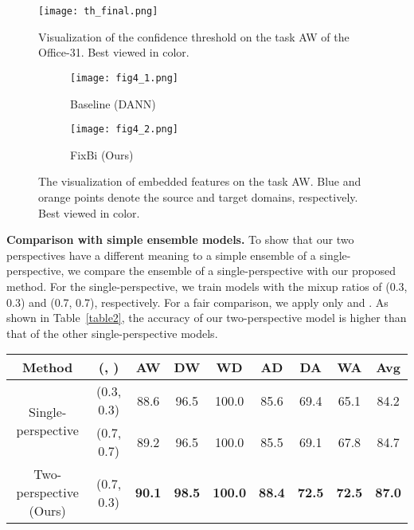 \documentclass[final]{cvpr}
\begin{document}
\begin{figure}[t]
\hspace{-3.0mm}
\centering
\texttt{[image: th\_final.png]}
\caption{Visualization of the confidence threshold  on the task AW of the Office-31. Best viewed in color.}
\label{fig:04}
\end{figure}

\begin{figure}[t]
    \hspace{1.5mm}
    \centering
    \begin{subfigure}[b]{0.45\columnwidth}
        \texttt{[image: fig4\_1.png]}
        \caption{Baseline (DANN)}
        \label{fig:05_1}
    \end{subfigure}
    \begin{subfigure}[b]{0.45\columnwidth}
        \texttt{[image: fig4\_2.png]}
        \caption{FixBi (Ours)}
        \label{fig:05_2}
    \end{subfigure}
    \vspace{1.5mm}
    \caption{The visualization of embedded features on the task AW. Blue and orange points denote the source and target domains, respectively. Best viewed in color.}
    \label{fig:05}
\end{figure}

\textbf{Comparison with simple ensemble models.} To show that our two perspectives have a different meaning to a simple ensemble of a single-perspective, we compare the ensemble of a single-perspective with our proposed method. For the single-perspective, we train models with the mixup ratios of (0.3, 0.3) and (0.7, 0.7), respectively. For a fair comparison, we apply only  and . As shown in Table~\ref{table2}, the accuracy of our two-perspective model is higher than that of the other single-perspective models.

\begin{table*}[t]
\centering
\caption{Comparison of ensemble networks on Office-31.}
\label{table2}
\begin{tabular}{c|c|c|c|c|c|c|c|c}
\hline
      Method   & (, ) & AW & DW & WD & AD & DA & WA & Avg           \\ \hline \hline
\multirow{2}{*}{Single-perspective} & (0.3, 0.3) & 88.6 & 96.5 &100.0 & 85.6 & 69.4 & 65.1 & 84.2 \\ 
\cline{2-9}
                   & (0.7, 0.7) & 89.2 & 96.5 &100.0 & 85.5 & 69.1 & 67.8 & 84.7 \\ \hline
Two-perspective (Ours) & (0.7, 0.3)                       & \textbf{90.1}   & \textbf{98.5}   & \textbf{100.0} & \textbf{88.4}   & \textbf{72.5}   & \textbf{72.5}   & \textbf{87.0} \\ \hline
\end{tabular}
\end{table*}
\end{document}
